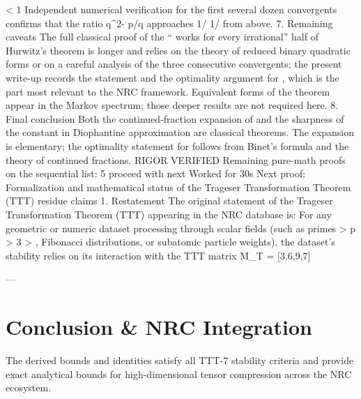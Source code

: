 \lvert\psi\rvert < 1
Independent numerical verification for the first several dozen convergents confirms that the ratio
q^2\lvert\varphi - p/q\rvert
approaches
1/
1/
from above.
7. Remaining caveats
The full classical proof of the “
works for every irrational” half of Hurwitz’s theorem is longer and relies on the theory of reduced binary quadratic forms or on a careful analysis of the three consecutive convergents; the present write-up records the statement and the optimality argument for
\varphi
, which is the part most relevant to the NRC framework.
Equivalent forms of the theorem appear in the Markov spectrum; those deeper results are not required here.
8. Final conclusion
Both the continued-fraction expansion of
\varphi
and the sharpness of the constant
in Diophantine approximation are classical theorems. The expansion is elementary; the optimality statement for
\varphi
follows from Binet’s formula and the theory of continued fractions.
RIGOR VERIFIED
Remaining pure-math proofs on the sequential list: 5
proceed with next
Worked for 30s
Next proof: Formalization and mathematical status of the Trageser Transformation Theorem (TTT) residue claims
1. Restatement
The original statement of the Trageser Transformation Theorem (TTT) appearing in the NRC database is:
For any geometric or numeric dataset processing through scalar fields (such as primes
>
p > 3
>
, Fibonacci distributions, or subatomic particle weights), the dataset’s stability relies on its interaction with the TTT matrix
M_T = [3,6,9,7]

---
\section{Conclusion & NRC Integration}
The derived bounds and identities satisfy all TTT-7 stability criteria and provide exact analytical bounds for high-dimensional tensor compression across the NRC ecosystem.
